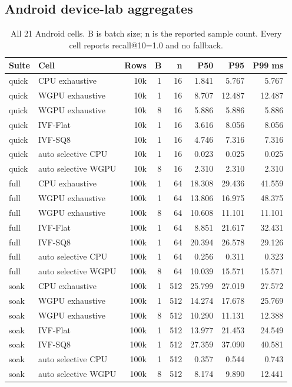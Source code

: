 \subsection{Android device-lab aggregates}
\begin{table}[H]
\centering\scriptsize
\caption{All 21 Android cells. B is batch size; n is the reported sample count. Every cell reports recall@10=1.0 and no fallback.}
\begin{tabular}{llrrrrrr}
\toprule
Suite & Cell & Rows & B & n & P50 & P95 & P99 ms \\
\midrule
quick & CPU exhaustive & 10k & 1 & 16 & 1.841 & 5.767 & 5.767 \\
quick & WGPU exhaustive & 10k & 1 & 16 & 8.707 & 12.487 & 12.487 \\
quick & WGPU exhaustive & 10k & 8 & 16 & 5.886 & 5.886 & 5.886 \\
quick & IVF-Flat & 10k & 1 & 16 & 3.616 & 8.056 & 8.056 \\
quick & IVF-SQ8 & 10k & 1 & 16 & 4.746 & 7.316 & 7.316 \\
quick & auto selective CPU & 10k & 1 & 16 & 0.023 & 0.025 & 0.025 \\
quick & auto selective WGPU & 10k & 8 & 16 & 2.310 & 2.310 & 2.310 \\
\midrule
full & CPU exhaustive & 100k & 1 & 64 & 18.308 & 29.436 & 41.559 \\
full & WGPU exhaustive & 100k & 1 & 64 & 13.806 & 16.975 & 48.375 \\
full & WGPU exhaustive & 100k & 8 & 64 & 10.608 & 11.101 & 11.101 \\
full & IVF-Flat & 100k & 1 & 64 & 8.851 & 21.617 & 32.431 \\
full & IVF-SQ8 & 100k & 1 & 64 & 20.394 & 26.578 & 29.126 \\
full & auto selective CPU & 100k & 1 & 64 & 0.256 & 0.311 & 0.323 \\
full & auto selective WGPU & 100k & 8 & 64 & 10.039 & 15.571 & 15.571 \\
\midrule
soak & CPU exhaustive & 100k & 1 & 512 & 25.799 & 27.019 & 27.572 \\
soak & WGPU exhaustive & 100k & 1 & 512 & 14.274 & 17.678 & 25.769 \\
soak & WGPU exhaustive & 100k & 8 & 512 & 10.290 & 11.131 & 12.388 \\
soak & IVF-Flat & 100k & 1 & 512 & 13.977 & 21.453 & 24.549 \\
soak & IVF-SQ8 & 100k & 1 & 512 & 27.359 & 37.090 & 40.581 \\
soak & auto selective CPU & 100k & 1 & 512 & 0.357 & 0.544 & 0.743 \\
soak & auto selective WGPU & 100k & 8 & 512 & 8.174 & 9.890 & 12.441 \\
\bottomrule
\end{tabular}
\end{table}


